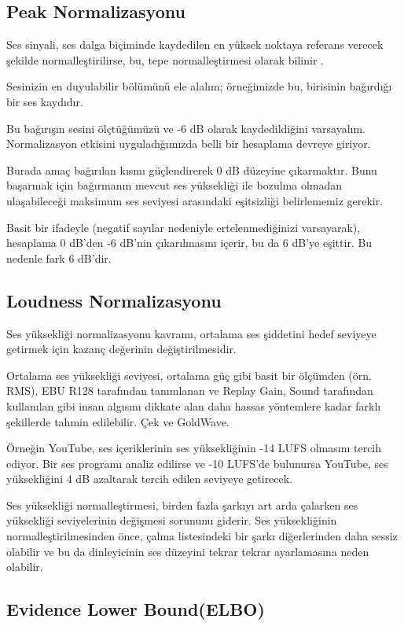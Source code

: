 \documentclass[12pt, a4paper]{article}
\begin{document}
			\subsection{Peak Normalizasyonu}
			Ses sinyali, ses dalga biçiminde kaydedilen en yüksek noktaya referans verecek şekilde normalleştirilirse, bu, tepe normalleştirmesi olarak bilinir \cite{audioNormalization}.
			
			Sesinizin en duyulabilir bölümünü ele alalım; örneğimizde bu, birisinin bağırdığı bir ses kaydıdır.
			
			Bu bağırışın sesini ölçtüğümüzü ve -6 dB olarak kaydedildiğini varsayalım. Normalizasyon etkisini uyguladığımızda belli bir hesaplama devreye giriyor.
			
			Burada amaç bağırılan kısmı güçlendirerek 0 dB düzeyine çıkarmaktır. Bunu başarmak için bağırmanın mevcut ses yüksekliği ile bozulma olmadan ulaşabileceği maksimum ses seviyesi arasındaki eşitsizliği belirlememiz gerekir.
			
			Basit bir ifadeyle (negatif sayılar nedeniyle ertelenmediğinizi varsayarak), hesaplama 0 dB'den -6 dB'nin çıkarılmasını içerir, bu da 6 dB'ye eşittir. Bu nedenle fark 6 dB'dir.
			
			\subsection{Loudness Normalizasyonu}
			Ses yüksekliği normalizasyonu kavramı, ortalama ses şiddetini hedef seviyeye getirmek için kazanç değerinin değiştirilmesidir.
			
			Ortalama ses yüksekliği seviyesi, ortalama güç gibi basit bir ölçümden (örn. RMS), EBU R128 tarafından tanımlanan ve Replay Gain, Sound tarafından kullanılan gibi insan algısını dikkate alan daha hassas yöntemlere kadar farklı şekillerde tahmin edilebilir. Çek ve GoldWave.
			
			Örneğin YouTube, ses içeriklerinin ses yüksekliğinin -14 LUFS olmasını tercih ediyor. Bir ses programı analiz edilirse ve -10 LUFS'de bulunursa YouTube, ses yüksekliğini 4 dB azaltarak tercih edilen seviyeye getirecek.
			
			Ses yüksekliği normalleştirmesi, birden fazla şarkıyı art arda çalarken ses yüksekliği seviyelerinin değişmesi sorununu giderir. Ses yüksekliğinin normalleştirilmesinden önce, çalma listesindeki bir şarkı diğerlerinden daha sessiz olabilir ve bu da dinleyicinin ses düzeyini tekrar tekrar ayarlamasına neden olabilir.
			
			\newpage
			\subsection{Evidence Lower Bound(ELBO)}
\end{document}
